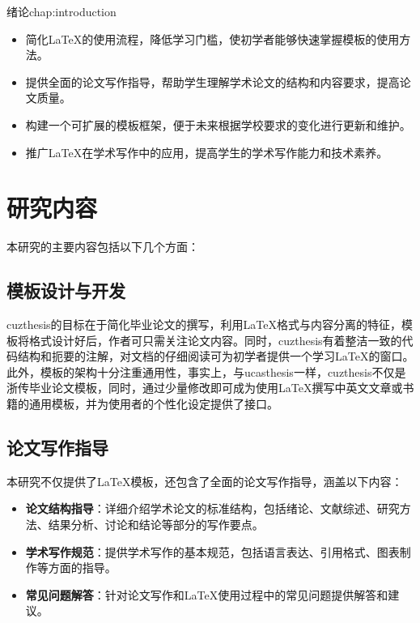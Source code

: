 \begin{cuzchapter}{绪论}{chap:introduction}
\begin{itemize}
		\item 简化\LaTeX{}的使用流程，降低学习门槛，使初学者能够快速掌握模板的使用方法。

		\item 提供全面的论文写作指导，帮助学生理解学术论文的结构和内容要求，提高论文质量。

		\item 构建一个可扩展的模板框架，便于未来根据学校要求的变化进行更新和维护。

		\item 推广\LaTeX{}在学术写作中的应用，提高学生的学术写作能力和技术素养。
	\end{itemize}

	\section{研究内容}\label{sec:content}

	本研究的主要内容包括以下几个方面：

	\subsection{模板设计与开发}

	cuzthesis的目标在于简化毕业论文的撰写，利用\LaTeX{}格式与内容分离的特征，模板将格式设计好后，作者可只需关注论文内容。同时，cuzthesis有着整洁一致的代码结构和扼要的注解，对文档的仔细阅读可为初学者提供一个学习\LaTeX{}的窗口。此外，模板的架构十分注重通用性，事实上，与ucasthesis一样，cuzthesis不仅是浙传毕业论文模板，同时，通过少量修改即可成为使用\LaTeX{}撰写中英文文章或书籍的通用模板，并为使用者的个性化设定提供了接口。

	\subsection{论文写作指导}

	本研究不仅提供了\LaTeX{}模板，还包含了全面的论文写作指导，涵盖以下内容：

	\begin{itemize}
		\item \textbf{论文结构指导}：详细介绍学术论文的标准结构，包括绪论、文献综述、研究方法、结果分析、讨论和结论等部分的写作要点。

		\item \textbf{学术写作规范}：提供学术写作的基本规范，包括语言表达、引用格式、图表制作等方面的指导。

		\item \textbf{常见问题解答}：针对论文写作和\LaTeX{}使用过程中的常见问题提供解答和建议。
	\end{itemize}


\end{cuzchapter}
